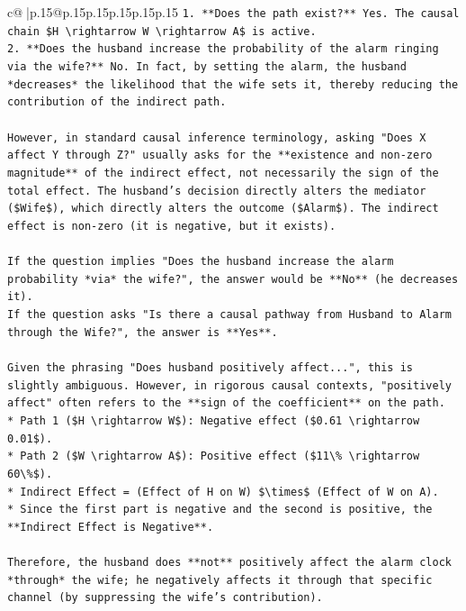 \documentclass{article}
\begin{document}
{\begin{supertabular}{c@{$\;$}|p{.15\linewidth}@{}p{.15\linewidth}p{.15\linewidth}p{.15\linewidth}p{.15\linewidth}p{.15\linewidth}}
{{{\texttt{1.  **Does the path exist?** Yes. The causal chain \$H \textbackslash{}rightarrow W \textbackslash{}rightarrow A\$ is active.} \\
\texttt{2.  **Does the husband increase the probability of the alarm ringing via the wife?** No. In fact, by setting the alarm, the husband *decreases* the likelihood that the wife sets it, thereby reducing the contribution of the indirect path.} \\
\\ 
\texttt{However, in standard causal inference terminology, asking "Does X affect Y through Z?" usually asks for the **existence and non{-}zero magnitude** of the indirect effect, not necessarily the sign of the total effect. The husband's decision directly alters the mediator (\$Wife\$), which directly alters the outcome (\$Alarm\$). The indirect effect is non{-}zero (it is negative, but it exists).} \\
\\ 
\texttt{If the question implies "Does the husband increase the alarm probability *via* the wife?", the answer would be **No** (he decreases it).} \\
\texttt{If the question asks "Is there a causal pathway from Husband to Alarm through the Wife?", the answer is **Yes**.} \\
\\ 
\texttt{Given the phrasing "Does husband positively affect...", this is slightly ambiguous. However, in rigorous causal contexts, "positively affect" often refers to the **sign of the coefficient** on the path.} \\
\texttt{*   Path 1 (\$H \textbackslash{}rightarrow W\$): Negative effect (\$0.61 \textbackslash{}rightarrow 0.01\$).} \\
\texttt{*   Path 2 (\$W \textbackslash{}rightarrow A\$): Positive effect (\$11\textbackslash{}\% \textbackslash{}rightarrow 60\textbackslash{}\%\$).} \\
\texttt{*   Indirect Effect = (Effect of H on W) \$\textbackslash{}times\$ (Effect of W on A).} \\
\texttt{*   Since the first part is negative and the second is positive, the **Indirect Effect is Negative**.} \\
\\ 
\texttt{Therefore, the husband does **not** positively affect the alarm clock *through* the wife; he negatively affects it through that specific channel (by suppressing the wife's contribution).} \\
\\ 
}}}
\end{supertabular}}
\end{document}
